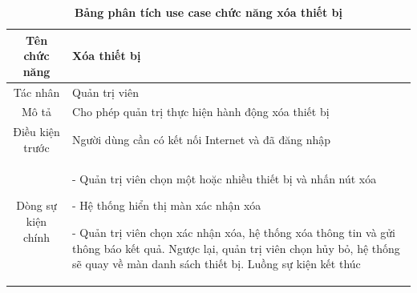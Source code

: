   \begin{table}[H]
    \caption{\bfseries \fontsize{12pt}{0pt}\selectfont Bảng phân tích use case chức năng xóa thiết bị}
    \centering
    \begin{tabularx}{0.9\textwidth}{|c|X|}
      \hline
      \textbf{Tên chức năng} & \textbf{Xóa thiết bị} \\
      \hline
      Tác nhân & Quản trị viên \\
      \hline
      Mô tả & Cho phép quản trị thực hiện hành động xóa thiết bị \\
      \hline
      Điều kiện trước & Người dùng cần có kết nối Internet và đã đăng nhập \\
      \hline
      Dòng sự kiện chính & 
        - Quản trị viên chọn một hoặc nhiều thiết bị và nhấn nút xóa

        - Hệ thống hiển thị màn xác nhận xóa

        - Quản trị viên chọn xác nhận xóa, hệ thống xóa thông tin và gửi thông báo kết quả. Ngược lại, quản trị viên 
        chọn hủy bỏ, hệ thống sẽ quay về màn danh sách thiết bị. Luồng sự kiện kết thúc
        \\
      \hline
    \end{tabularx}
  \end{table}
  
